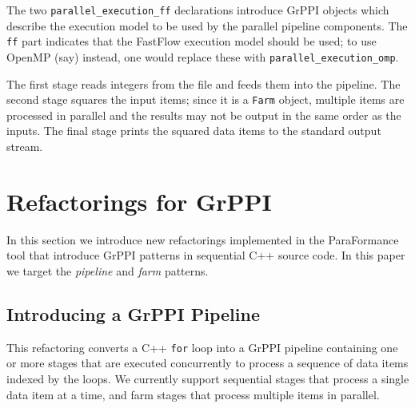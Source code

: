 The two \verb|parallel_execution_ff| declarations introduce GrPPI
objects which describe the execution model to be used by 
the parallel pipeline components.  The \verb|ff| part indicates that
the FastFlow execution model should be used; to use OpenMP (say)
instead, one would replace these with \verb|parallel_execution_omp|.

The first stage reads integers from the file and feeds them into the pipeline.
The second stage squares the input items; since it is a \verb|Farm| object,
multiple items are processed in parallel and the results may not be output
in the same order as the inputs.
The final stage prints the squared data items to the standard output stream.


\section{Refactorings for GrPPI}
\label{refactoring_grppi}

In this section we introduce new refactorings implemented in the ParaFormance tool that introduce GrPPI patterns in sequential C++ source code. In this paper we target the \emph{pipeline} and \emph{farm} patterns.

\subsection{Introducing a GrPPI Pipeline}\label{refactoring-interface}

This refactoring converts a C++
\texttt{for} loop into a GrPPI pipeline containing one or more stages
that are executed concurrently to process a sequence of data items
indexed by the loops. We currently support sequential stages that
process a single data item at a time, and farm stages that process
multiple items in parallel. 


